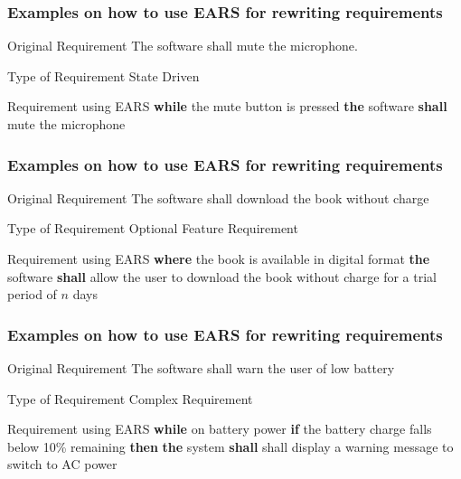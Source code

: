 \documentclass[aspectratio=169]{beamer}
\newcommand{\earss}[3]{{\bf \color{mygreen}while} {#1} {\bf \color{mypurple}the} {#2} {\bf \color{mypurple}shall} {#3}}
\newcommand{\earso}[3]{{\bf \color{mygreen}where} {#1} {\bf \color{mypurple}the} {#2} {\bf \color{mypurple}shall} {#3}}
\newcommand{\earsw}[3]{{\bf \color{mygreen}if} {#1} {\bf \color{mygreen}then} {\bf \color{mypurple}the} {#2} {\bf \color{mypurple}shall} {#3}}
\begin{document}
\begin{frame}
  \frametitle{Examples on how to use EARS for rewriting requirements}
  \begin{block}{Original Requirement}
    The software shall mute the microphone.
  \end{block}
  \begin{block}{Type of Requirement}
  State Driven 
  \end{block}
  \begin{block}{Requirement using EARS}
    \earss{the mute button is pressed}{software}{mute the microphone}
  \end{block}
\end{frame}

\begin{frame}
  \frametitle{Examples on how to use EARS for rewriting requirements}
  \begin{block}{Original Requirement}
    The software shall download the book without charge
  \end{block}
  \begin{block}{Type of Requirement}
  Optional Feature Requirement 
  \end{block}
  \begin{block}{Requirement using EARS}
    \earso{the book is available in digital format}{software}{allow the user to download the book without charge for a trial period of $n$ days}
  \end{block}
\end{frame}

\begin{frame}
  \frametitle{Examples on how to use EARS for rewriting requirements}
  \begin{block}{Original Requirement}
    The software shall warn the user of low battery
  \end{block}
  \begin{block}{Type of Requirement}
  Complex Requirement 
  \end{block}
  \begin{block}{Requirement using EARS}
    {\bf \color{mygreen}while} on battery power \earsw{the battery charge falls below 10\%
remaining}{system}{shall display a warning message to switch to AC power}
  \end{block}
\end{frame}

%    
%    
\end{document}
